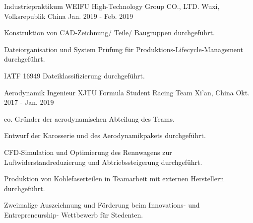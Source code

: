 \begin{cventries}
  \cventry
  {Industriepraktikum} %
  {WEIFU High-Technology Group CO., LTD.} %
  {Wuxi, Volksrepublik China} %
  {Jan. 2019 - Feb. 2019} %
  {
    \begin{cvitems} %
      \item {Konstruktion von CAD-Zeichnung/ Teile/ Baugruppen durchgeführt.}
      \item {Dateiorganisation und System Prüfung für Produktions-Lifecycle-Management durchgeführt.}
      \item {IATF 16949 Dateiklassifizierung durchgeführt.}
    \end{cvitems}
  }

  \cventry
  {Aerodynamik Ingenieur} %
  {XJTU Formula Student Racing Team} %
  {Xi'an, China} %
  {Okt. 2017 - Jan. 2019} %
  {
    \begin{cvitems} %
      \item {co. Gründer der aerodynamischen Abteilung des Teams.}
      \item {Entwurf der Karosserie und des Aerodynamikpakets durchgeführt.}
      \item {CFD-Simulation und Optimierung des Rennwagens zur Luftwiderstandreduzierung und Abtriebssteigerung durchgeführt.}
      \item {Produktion von Kohlefaserteilen in Teamarbeit mit externen Herstellern durchgeführt.}
      \item {Zweimalige Auszeichnung und Förderung beim Innovations- und Entrepreneurship- Wettbewerb für Stedenten.}
    \end{cvitems}
  }

\end{cventries}
